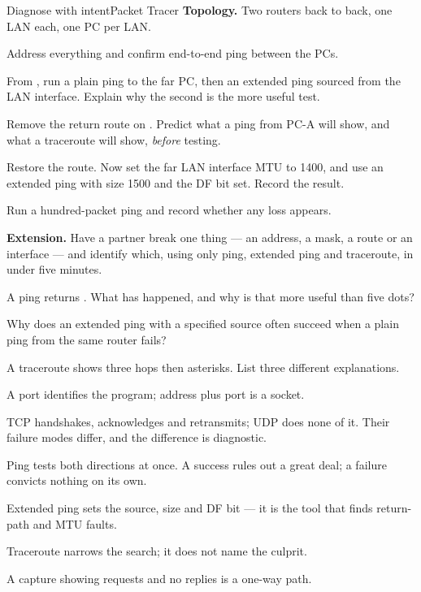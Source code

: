 \begin{lab}{Diagnose with intent}{Packet Tracer}
\textbf{Topology.} Two routers back to back, one LAN each, one PC per LAN.

\begin{tasks}
  \item Address everything and confirm end-to-end ping between the PCs.
  \item From , run a plain ping to the far PC, then an extended ping
        sourced from the LAN interface. Explain why the second is the more
        useful test.
  \item Remove the return route on . Predict what a ping from PC-A will
        show, and what a traceroute will show, \emph{before} testing.
  \item Restore the route. Now set the far LAN interface MTU to 1400, and use an
        extended ping with size 1500 and the DF bit set. Record the result.
  \item Run a hundred-packet ping and record whether any loss appears.
  \item \textbf{Extension.} Have a partner break one thing --- an address, a
        mask, a route or an interface --- and identify which, using only ping,
        extended ping and traceroute, in under five minutes.
\end{tasks}
\end{lab}

\begin{checkpoint}
\begin{tightnum}
  \item A ping returns . What has happened, and why is that more
        useful than five dots?
  \item Why does an extended ping with a specified source often succeed when a
        plain ping from the same router fails?
  \item A traceroute shows three hops then asterisks. List three different
        explanations.
\end{tightnum}
\end{checkpoint}

\begin{chaptersummary}
\begin{tight}
  \item A port identifies the program; address plus port is a socket.
  \item TCP handshakes, acknowledges and retransmits; UDP does none of it. Their
        failure modes differ, and the difference is diagnostic.
  \item Ping tests both directions at once. A success rules out a great deal; a
        failure convicts nothing on its own.
  \item Extended ping sets the source, size and DF bit --- it is the tool that
        finds return-path and MTU faults.
  \item Traceroute narrows the search; it does not name the culprit.
  \item A capture showing requests and no replies is a one-way path.
\end{tight}
\end{chaptersummary}

